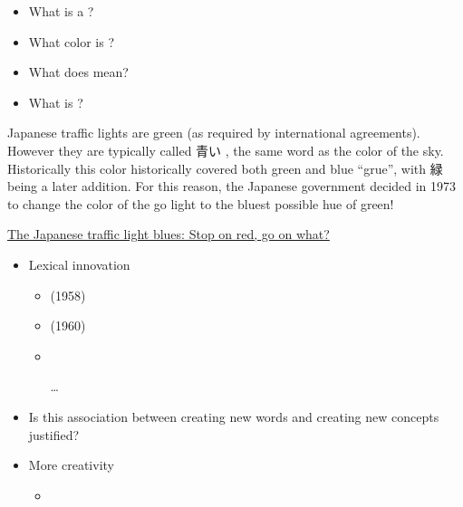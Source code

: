 \documentclass[a4paper,landscape,headrule,footrule,xetex,25pt]{foils}
\begin{document}

\begin{itemize}
\item What is a ?
\item What color is ?
\item What does  mean?
\item What is  ?
\end{itemize}

\newpage

Japanese traffic lights are green (as required by international
agreements).  However they are typically called 青い ,
the same word as the color of the sky.  Historically this color
historically covered both green and blue ``grue'',
with 緑  being a later addition.  For this reason,
the Japanese government decided in 1973 to change the color of the go
light to the bluest possible hue of green!


\href{https://www.japantimes.co.jp/life/2013/02/25/language/the-japanese-traffic-light-blues-stop-on-red-go-on-what/#.WRmAuuWGNPZ}{The Japanese traffic light blues: Stop on red, go on what?}
 



\begin{itemize}
\item Lexical innovation
  \begin{itemize}
  \item {} (1958)
  \item {} (1960)
  \item {}
  \item[\ldots]
  \end{itemize}
\item   Is this association between creating new words and creating new concepts justified?
\item More creativity
  \begin{itemize}
  \item {}
  \end{itemize}
\end{itemize}

\end{document}
